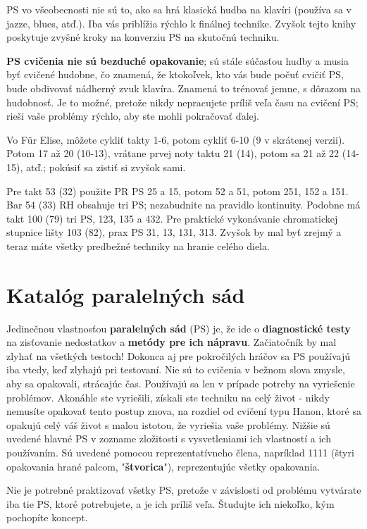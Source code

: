 \documentclass[11pt,a4paper]{book}
\begin{document}
PS vo všeobecnosti nie sú to, ako sa hrá klasická hudba na klavíri (používa sa v jazze, blues, atď.). Iba vás priblížia rýchlo k finálnej technike. Zvyšok tejto knihy poskytuje zvyšné kroky na konverziu PS na skutočnú techniku.

\textbf{PS cvičenia nie sú bezduché opakovanie}; sú stále súčasťou hudby a musia byť cvičené hudobne, čo znamená, že ktokoľvek, kto vás bude počuť cvičiť PS, bude obdivovať nádherný zvuk klavíra. Znamená to trénovať jemne, s dôrazom na hudobnosť. Je to možné, pretože nikdy nepracujete príliš veľa času na cvičení PS; rieši vaše problémy rýchlo, aby ste mohli pokračovať ďalej.

Vo Für Elise, môžete cykliť takty 1-6, potom cykliť 6-10 (9 v skrátenej verzii). Potom 17 až 20 (10-13), vrátane prvej noty taktu 21 (14), potom sa 21 až 22 (14-15), atď.; pokúsiť sa zistiť si zvyšok sami.

Pre takt 53 (32) použite PR PS 25 a 15, potom 52 a 51, potom 251, 152 a 151. Bar 54 (33) RH obsahuje tri PS; nezabudnite na pravidlo kontinuity. Podobne má takt 100 (79) tri PS, 123, 135 a 432. Pre praktické vykonávanie chromatickej stupnice lišty 103 (82), prax PS 31, 13, 131, 313. Zvyšok by mal byť zrejmý a teraz máte všetky predbežné techniky na hranie celého diela.

\section{Katalóg paralelných sád}\label{s:parallel-catalogue}
Jedinečnou vlastnosťou \textbf{paralelných sád} (PS) je, že ide o \textbf{diagnostické testy} na zisťovanie nedostatkov a \textbf{metódy pre ich nápravu}. Začiatočník by mal zlyhať na všetkých testoch! Dokonca aj pre pokročilých hráčov sa PS používajú iba vtedy, keď zlyhajú pri testovaní. Nie sú to cvičenia v bežnom slova zmysle, aby sa opakovali, strácajúc čas. Používajú sa len v prípade potreby na vyriešenie problémov. Akonáhle ste vyriešili, získali ste techniku ​​na celý život - nikdy nemusíte opakovať tento postup znova, na rozdiel od cvičení typu Hanon, ktoré sa opakujú celý váš život s malou istotou, že vyriešia vaše problémy. Nižšie sú uvedené hlavné PS v zozname zložitosti s vysvetleniami ich vlastností a ich používaním. Sú uvedené pomocou reprezentatívneho člena, napríklad 1111 (štyri opakovania hrané palcom, "\textbf{štvorica}"), reprezentujúc všetky opakovania.

Nie je potrebné praktizovať všetky PS, pretože v závislosti od problému vytvárate iba tie PS, ktoré potrebujete, a je ich príliš veľa. Študujte ich niekoľko, kým pochopíte koncept.
\end{document}
